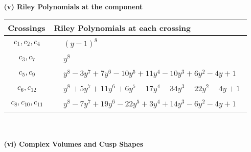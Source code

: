 \documentclass[1p]{elsarticle_modified}
\theoremstyle{definition}
\begin{document}
\newpage\renewcommand{\arraystretch}{1}
\flushleft \textbf{(v) Riley Polynomials at the component}\newline \\
\begin{tabular}{m{50pt}|m{274pt}}
Crossings & \hspace{64pt}Riley Polynomials at each crossing \\
\hline $$\begin{aligned}c_{1},c_{2},c_{4}\end{aligned}$$&$\begin{aligned}
&(y-1)^8
\end{aligned}$\\
\hline $$\begin{aligned}c_{3},c_{7}\end{aligned}$$&$\begin{aligned}
&y^8
\end{aligned}$\\
\hline $$\begin{aligned}c_{5},c_{9}\end{aligned}$$&$\begin{aligned}
&y^8-3 y^7+7 y^6-10 y^5+11 y^4-10 y^3+6 y^2-4 y+1
\end{aligned}$\\
\hline $$\begin{aligned}c_{6},c_{12}\end{aligned}$$&$\begin{aligned}
&y^8+5 y^7+11 y^6+6 y^5-17 y^4-34 y^3-22 y^2-4 y+1
\end{aligned}$\\
\hline $$\begin{aligned}c_{8},c_{10},c_{11}\end{aligned}$$&$\begin{aligned}
&y^8-7 y^7+19 y^6-22 y^5+3 y^4+14 y^3-6 y^2-4 y+1
\end{aligned}$\\
\hline
\end{tabular}\\~\\
\newpage\flushleft \textbf{(vi) Complex Volumes and Cusp Shapes}
\end{document}

